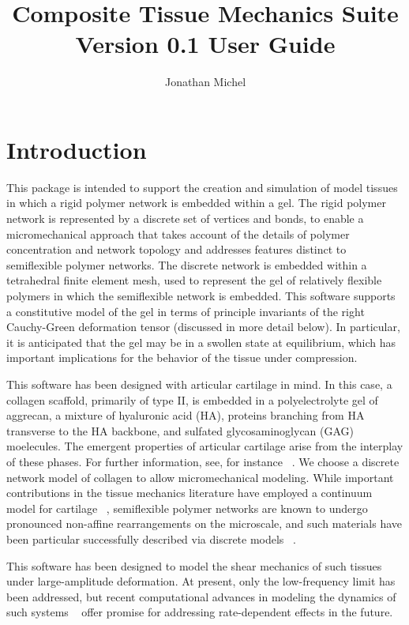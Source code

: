 \documentclass{article}
\author{Jonathan Michel}
\title{Composite Tissue Mechanics Suite Version 0.1 User Guide}
\begin{document}
\maketitle

\tableofcontents

\section{Introduction}

This package is intended to support the creation and simulation of model
tissues in which a rigid polymer network is embedded within a gel. The rigid
polymer network is represented by a discrete set of vertices and bonds, to
enable a micromechanical approach that takes account of the details of
polymer concentration and network topology and addresses features distinct to
semiflexible polymer networks. The discrete network is embedded within a
tetrahedral finite element mesh, used to represent the gel of relatively
flexible polymers in which the semiflexible network is embedded. This software
supports a constitutive model of the gel in terms of principle invariants
of the right Cauchy-Green deformation tensor (discussed in more detail below).
In particular, it is anticipated that the gel may be in a swollen state at
equilibrium, which has important implications for the behavior of the tissue
under compression.

This software has been designed with articular cartilage in mind. In this
case, a collagen scaffold, primarily of type II, is embedded in a
polyelectrolyte gel of aggrecan, a mixture of hyaluronic acid (HA), proteins
branching from HA transverse to the HA backbone, and sulfated
glycosaminoglycan (GAG) moelecules. The emergent properties of articular
cartilage arise from the interplay of these phases. For further information,
see, for instance ~\cite{mow92,gahunia,das_review}. We choose a discrete
network model of collagen to allow micromechanical modeling. While important
contributions in the tissue mechanics literature have employed a continuum
model for cartilage ~\cite{moo_acta_bio, chen_gag}, semiflexible polymer
networks are known to undergo pronounced non-affine rearrangements on the
microscale, and such materials have been particular successfully described via
discrete models ~\cite{broedersz}.

This software has been designed to model the shear mechanics of such tissues
under large-amplitude deformation. At present, only the low-frequency limit has 
been addressed, but recent computational advances in modeling the dynamics of
such systems ~\cite{hong_polyelec, bouklas2015, zhang_kinetics} offer promise for addressing rate-dependent effects in the future.
\end{document}

